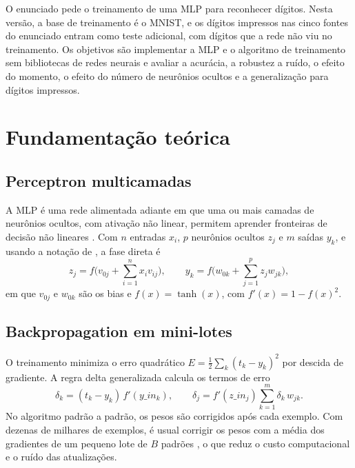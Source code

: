 \documentclass[12pt,a4paper]{article}
\begin{document}
O enunciado pede o treinamento de uma MLP para reconhecer dígitos. Nesta versão, a base de
treinamento é o MNIST, e os dígitos impressos nas cinco fontes do enunciado entram como
teste adicional, com dígitos que a rede não viu no treinamento. Os objetivos são
implementar a MLP e o algoritmo de treinamento sem bibliotecas de redes neurais e avaliar
a acurácia, a robustez a ruído, o efeito do momento, o efeito do número de neurônios
ocultos e a generalização para dígitos impressos.

\section{Fundamentação teórica}

\subsection{Perceptron multicamadas}

A MLP é uma rede alimentada adiante em que uma ou mais camadas de neurônios ocultos, com
ativação não linear, permitem aprender fronteiras de decisão não lineares
\cite{haykin2009,braga2007}. Com $n$ entradas $x_i$, $p$ neurônios ocultos $z_j$ e $m$
saídas $y_k$, e usando a notação de , a fase direta é
\begin{equation}
z_j = f\Big(v_{0j} + \sum_{i=1}^{n} x_i v_{ij}\Big), \qquad
y_k = f\Big(w_{0k} + \sum_{j=1}^{p} z_j w_{jk}\Big),
\end{equation}
em que $v_{0j}$ e $w_{0k}$ são os bias e $f(x)=\tanh(x)$, com $f'(x)=1-f(x)^2$.

\subsection{Backpropagation em mini-lotes}

O treinamento minimiza o erro quadrático $E=\frac12\sum_k (t_k-y_k)^2$ por descida de
gradiente. A regra delta generalizada \cite{rumelhart1986} calcula os termos de erro
\begin{equation}
\delta_k = (t_k-y_k)\,f'(y\_in_k), \qquad
\delta_j = f'(z\_in_j)\sum_{k=1}^{m}\delta_k\,w_{jk}.
\end{equation}
No algoritmo padrão a padrão, os pesos são corrigidos após cada exemplo. Com dezenas de
milhares de exemplos, é usual corrigir os pesos com a média dos gradientes de um pequeno
lote de $B$ padrões \cite{haykin2009}, o que reduz o custo computacional e o ruído das
atualizações.
\end{document}

